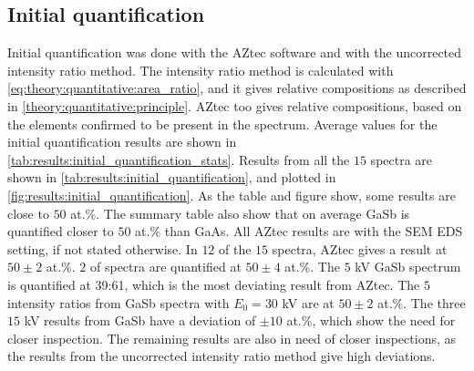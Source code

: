 \subsection{Initial quantification}
\label{results:initial_quantification}

Initial quantification was done with the AZtec software and with the uncorrected intensity ratio method.
The intensity ratio method is calculated with \cref{eq:theory:quantitative:area_ratio}, and it gives relative compositions as described in \cref{theory:quantitative:principle}.
AZtec too gives relative compositions, based on the elements confirmed to be present in the spectrum.
Average values for the initial quantification results are shown in \cref{tab:results:initial_quantification_stats}.
Results from all the $15$ spectra are shown in \cref{tab:results:initial_quantification}, and plotted in \cref{fig:results:initial_quantification}.
As the table and figure show, some results are close to $50$ at.\%.
The summary table also show that on average GaSb is quantified closer to $50$ at.\% than GaAs.
All AZtec results are with the SEM EDS setting, if not stated otherwise.
In $12$ of the $15$ spectra, AZtec gives a result at $50\pm2$ at.\%.
$2$ of spectra are quantified at $50\pm4$ at.\%.
The $5$ kV GaSb spectrum is quantified at 39:61, which is the most deviating result from AZtec.
The $5$ intensity ratios from GaSb spectra with $E_0 = 30$ kV are at $50\pm2$ at.\%.
The three $15$ kV results from GaSb have a deviation of $\pm10$ at.\%, which show the need for closer inspection.
The remaining results are also in need of closer inspections, as the results from the uncorrected intensity ratio method give high deviations.


